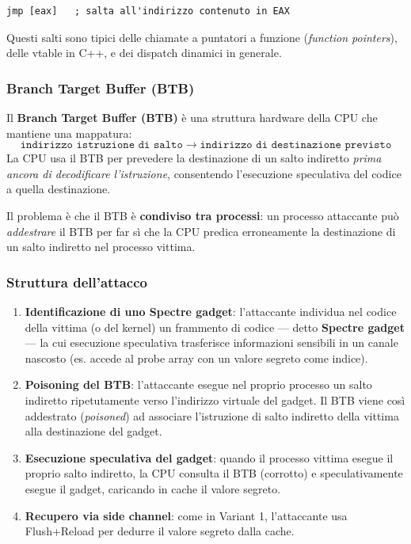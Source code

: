 \documentclass{article}
\begin{document}
\begin{lstlisting}[language={[x86masm]Assembler}]
jmp [eax]   ; salta all'indirizzo contenuto in EAX
\end{lstlisting}

Questi salti sono tipici delle chiamate a puntatori a funzione 
(\textit{function pointers}), delle vtable in C++, e dei dispatch 
dinamici in generale.

\subsubsection*{Branch Target Buffer (BTB)}

Il \textbf{Branch Target Buffer (BTB)} è una struttura hardware 
della CPU che mantiene una mappatura:
\[
    \texttt{indirizzo istruzione di salto} 
    \;\longrightarrow\; 
    \texttt{indirizzo di destinazione previsto}
\]
La CPU usa il BTB per prevedere la destinazione di un salto indiretto 
\textit{prima ancora di decodificare l'istruzione}, consentendo 
l'esecuzione speculativa del codice a quella destinazione.

Il problema è che il BTB è \textbf{condiviso tra processi}: un 
processo attaccante può \textit{addestrare} il BTB per far sì che 
la CPU predica erroneamente la destinazione di un salto indiretto 
nel processo vittima.

\subsubsection*{Struttura dell'attacco}

\begin{enumerate}
    \item \textbf{Identificazione di uno Spectre gadget}: l'attaccante 
    individua nel codice della vittima (o del kernel) un frammento di 
    codice --- detto \textbf{Spectre gadget} --- la cui esecuzione 
    speculativa trasferisce informazioni sensibili in un canale nascosto 
    (es. accede al probe array con un valore segreto come indice).

    \item \textbf{Poisoning del BTB}: l'attaccante esegue nel 
    proprio processo un salto indiretto ripetutamente verso 
    l'indirizzo virtuale del gadget. Il BTB viene così addestrato 
    (\textit{poisoned}) ad associare l'istruzione di salto indiretto 
    della vittima alla destinazione del gadget.

    \item \textbf{Esecuzione speculativa del gadget}: quando il 
    processo vittima esegue il proprio salto indiretto, la CPU 
    consulta il BTB (corrotto) e speculativamente esegue il gadget, 
    caricando in cache il valore segreto.

    \item \textbf{Recupero via side channel}: come in Variant 1, 
    l'attaccante usa Flush+Reload per dedurre il valore segreto 
    dalla cache.
\end{enumerate}
\end{document}

